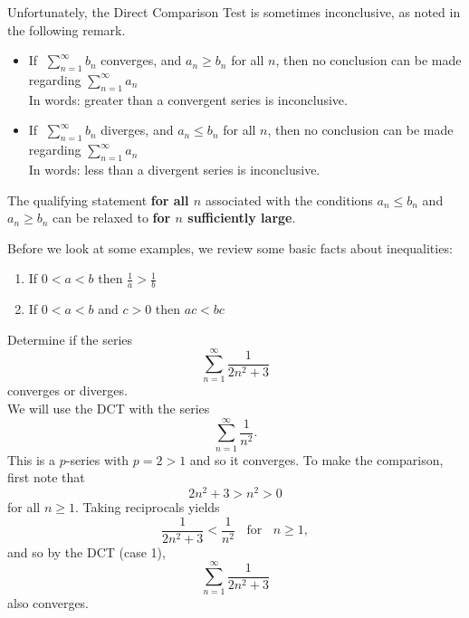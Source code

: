 \documentclass[handout]{ximera}
\begin{document}
Unfortunately, the Direct Comparison Test is sometimes inconclusive, as noted in the following remark.
\begin{remark}
\begin{itemize}
\item
If $\; \displaystyle{\sum_{n=1}^\infty b_n}$ converges, and $a_n \geq b_n$ for all $n$,  
then no conclusion can be made regarding $\displaystyle{\sum_{n=1}^\infty a_n}$ \\
In words: greater than a convergent series is inconclusive.\\
\item
If $\; \displaystyle{\sum_{n=1}^\infty b_n}$ diverges, and $a_n \leq b_n$ for all $n$,  
then no conclusion can be made regarding $\displaystyle{\sum_{n=1}^\infty a_n}$\\
In words: less than a divergent series is inconclusive.\\
\end{itemize}
\end{remark}

\begin{remark}
The qualifying statement \textbf{for all $n$} associated with the
 conditions $a_n \leq b_n$ and $ a_n \geq b_n$ can be relaxed to
  \textbf{for $n$ sufficiently large}.
\end{remark}

Before we look at some examples, we review some basic facts about inequalities:

\begin{enumerate}
\item If $0 < a< b$ then $\frac{1}{a} > \frac{1}{b}$
\item If $0<a<b$ and $c>0$ then $ac< bc$
\end{enumerate}

\begin{example}[example 1] %
Determine if the series 
\[
\sum_{n=1}^\infty \frac{1}{2n^2 + 3}
\]
converges or diverges.\\
We will use the DCT with the series 
\[
\sum_{n=1}^\infty \frac{1}{n^2}.
\] 
This is a $p$-series with $p=2 >1$ and so it converges.
To make the comparison, first note that 
\[
2n^2 + 3 > n^2 > 0
\]
 for all $n \geq 1$. Taking reciprocals yields 
\[
\frac{1}{2n^2 + 3} < \frac{1}{n^2} \; \; \text{ for } \; \; n \geq 1,
\]
and so by the DCT (case 1), 
\[
\sum_{n=1}^\infty \frac{1}{2n^2 + 3}
\]
 also converges.
\end{example}
\end{document}
